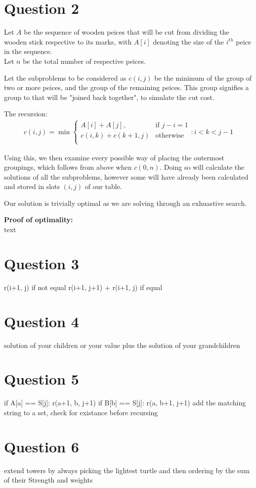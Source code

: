 \documentclass{article}
\begin{document}
\section*{Question 2}
Let $A$ be the sequence of wooden peices that will be cut from dividing the wooden stick respective to its marks, with $A[i]$ denoting the size of the $i^{th}$ peice in the sequence.\\
Let $n$ be the total number of respective peices.

Let the subproblems to be considered as $c(i, j)$ be the minimum of the group of two or more peices, and the group of the remaining peices. This group signifies a group to that will be "joined back together", to simulate the cut cost.

The recursion:\\
\begin{align*}
c(i, j) = \min
\begin{cases}
    A[i] + A[j],        & \text{if } j - i = 1\\
    c(i, k) + c(k+1, j) & \text{otherwise}\\
\end{cases}
    : i < k < j - 1
\end{align*}

Using this, we then examine every possible way of placing the outermost groupings, which follows from above when $c(0, n)$. Doing so will calculate the solutions of all the subproblems, however some will have already been calculated and stored in slots $(i, j)$ of our table.

Our solution is trivially optimal as we are solving through an exhuastive search.

\textbf{Proof of optimality:}\\
text

\section*{Question 3}
r(i+1, j) if not equal
r(i+1, j+1) + r(i+1, j) if equal

\section*{Question 4}
solution of your children
or your value plus the solution of your grandchildren

\section*{Question 5}
if A[a] == S[j]:
    r(a+1, b, j+1)
if B[b] == S[j]:
    r(a, b+1, j+1)
add the matching string to a set, check for existance before recursing

\section*{Question 6}
extend towers by always picking the lightest turtle and then ordering by the sum of their Strength and weights
\end{document}
